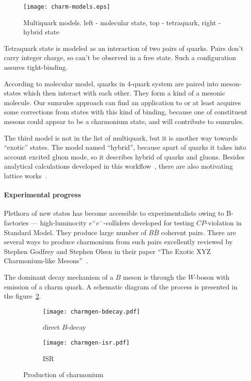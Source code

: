 \begin{figure}[H]
    \centering
    \texttt{[image: charm-models.eps]}
    \caption{Multiquark models. left - molecular state, top - tetraquark, right - hybrid state\label{fig:charm-models}}
\end{figure}

Tetraquark state is modeled as an interaction of two pairs of quarks. Pairs don't carry integer charge, so can't be observed in a free state. Such a configuration assures tight-binding.

According to molecular model, quarks in 4-quark system are paired into meson-states which then interact with each other. They form a kind of a mesonic molecule. Our sumrules approach can find an application to or at least acquires some corrections from states with this kind of binding, because one of constituent mesons could appear to be a charmonium state, and will contribute to sumrules.

The third model is not in the list of multiquark, but it is another way towards ``exotic'' states. The model named ``hybrid'', because apart of quarks it takes into account excited gluon mode, so it describes hybrid of quarks and gluons. Besides analytical calculations developed in this workflow~\cite{hybrid-th}, there are also motivating lattice works~\cite{hybrid-lattice1, hybrid-lattice2}. 

\paragraph{Experimental progress}
Plethora of new states has become accessible to experimentalists owing to B-factories --- high-luminocity $e^+ e^-$-colliders developed for testing $CP$-violation in Standard Model. They produce large number of $B\bar{B}$ coherent pairs. There are several ways to produce charmonium from such pairs excellently reviewed by Stephen Godfrey and Stephen Olsen in their paper ``The Exotic XYZ Charmonium-like Mesons''~\cite{godfrey-olsen}.

The dominant decay mechanism of a $B$ meson is through the $W$-boson with emission of a charm quark. A schematic diagram of the process is presented in the figure~\cref{fig:charmgen-bdecay}.

\begin{figure}[H]
    \centering
    \begin{subfigure}[b]{0.4\textwidth}
        \texttt{[image: charmgen-bdecay.pdf]}
        \caption{direct $B$-decay} \label{fig:charmgen-bdecay}
    \end{subfigure}
    \begin{subfigure}[b]{0.4\textwidth}
        \texttt{[image: charmgen-isr.pdf]}
        \caption{ISR} \label{fig:charmgen-isr}
    \end{subfigure}
    \caption{Production of charmonium}
\end{figure}

